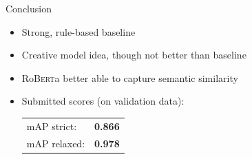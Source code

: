 \documentclass[english,handout]{mlutalk}
\newcommand{\Roberta}{\mbox{Ro\textsc{Bert}a}\xspace}
\begin{document}
\begin{frame}{Conclusion}
  \begin{itemize}
    \item Strong, rule-based baseline
    \item Creative model idea, though not better than baseline
    \item \Roberta better able to capture semantic similarity
    \item Submitted scores (on validation data): \\
    \begin{tabular}{@{}lc}
      mAP strict: & \textbf{0.866} \\
      mAP relaxed: & \textbf{0.978}
    \end{tabular}
  \end{itemize}
\end{frame}

\appendix
\section{\appendixname}

\bibliographyframe
\end{document}
